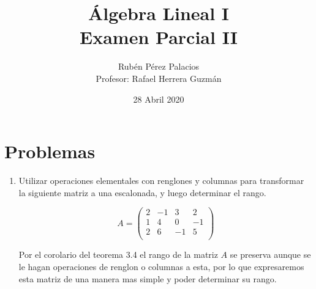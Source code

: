 \documentclass[letterpaper]{article}
\title{Álgebra Lineal I\\Examen Parcial II}
\author{Rubén Pérez Palacios\\Profesor: Rafael Herrera Guzmán}
\date{28 Abril 2020}
\theoremstyle{definition}
\theoremstyle{lemathm}
\theoremstyle{lemademthm}
\begin{document}
	\maketitle
    
    \section*{Problemas}

    \begin{enumerate}
        
        \item Utilizar operaciones elementales con renglones y columnas para transformar la siguiente matriz a una escalonada, y luego determinar el rango.
		
		\[A = \begin{pmatrix}
			2 & -1 & 3 & 2\\
			1 & 4 & 0 & -1\\
			2 & 6 & -1 & 5\\
		\end{pmatrix}\]

		Por el corolario del teorema 3.4 el rango de la matriz $A$ se preserva aunque se le hagan operaciones de renglon o columnas a esta, por lo que expresaremos esta matriz de una manera mas simple y poder determinar su rango.


\end{enumerate}
\end{document}
